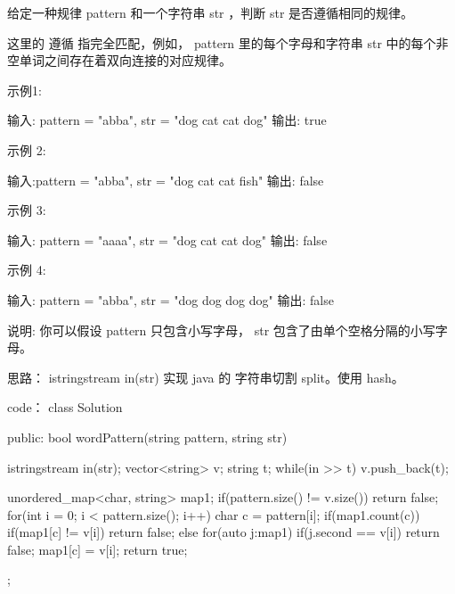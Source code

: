 给定一种规律 pattern 和一个字符串 str ，判断 str 是否遵循相同的规律。

这里的 遵循 指完全匹配，例如， pattern 里的每个字母和字符串 str 中的每个非空单词之间存在着双向连接的对应规律。

示例1:

输入: pattern = "abba", str = "dog cat cat dog"
输出: true

示例 2:

输入:pattern = "abba", str = "dog cat cat fish"
输出: false

示例 3:

输入: pattern = "aaaa", str = "dog cat cat dog"
输出: false

示例 4:

输入: pattern = "abba", str = "dog dog dog dog"
输出: false

说明:
你可以假设 pattern 只包含小写字母， str 包含了由单个空格分隔的小写字母。    

























思路：
istringstream in(str) 实现 java 的 字符串切割 split。使用 hash。

















code：
class Solution {
public:
    bool wordPattern(string pattern, string str) {
        istringstream in(str);
        vector<string> v;
        string t;
        while(in >> t) v.push_back(t);

        unordered_map<char, string> map1;
        if(pattern.size() != v.size()) return false;
        for(int i = 0; i < pattern.size(); i++)
        {
            char c = pattern[i];
            if(map1.count(c))
            {
                if(map1[c] != v[i]) return false;
            }
            else
            {
                for(auto j:map1)
                {
                    if(j.second == v[i]) return false;
                }
                map1[c] = v[i];
            }
        }
        return true;
    }
};